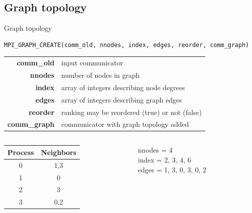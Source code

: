 \documentclass[aspectratio=43]{beamer}
\begin{document}
\subsection{Graph topology}
\begin{frame}[fragile]{Graph topology}
\footnotesize
\vspace{-1.3cm}
\begin{verbatim}
MPI_GRAPH_CREATE(comm_old, nnodes, index, edges, reorder, comm_graph)
\end{verbatim}
\vspace{-0.2cm}
\begin{black1block}{}
\begin{tabular}{rp{8cm}}
\textbf{comm\_old} & input communicator\\
\textbf{nnodes} & number of nodes in graph\\
\textbf{index} & array of integers describing node degrees\\
\textbf{edges} & array of integers describing graph edges\\
\textbf{reorder} & ranking may be reordered (true) or not (false)\\
\textbf{comm\_graph} & communicator with graph topology added\\
\end{tabular}
\end{black1block}
\begin{columns}
\begin{column}{0.3\paperwidth}
\begin{tabular}{|c|c|}\hline
    Process & Neighbors\\\hline
    0 & 1,3\\\hline
    1 & 0\\\hline
    2 & 3\\\hline
    3 & 0,2\\\hline
\end{tabular}
\end{column}

\begin{column}{0.3\paperwidth}
\begin{black1block}{}
nnodes = 4\\
index = 2, 3, 4, 6\\
edges = 1, 3, 0, 3, 0, 2\\
\end{black1block}
\end{column}


\end{columns}
\end{frame}
\end{document}
